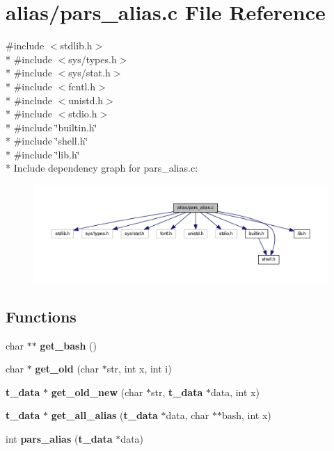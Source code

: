 \section{alias/pars\-\_\-alias.c File Reference}
\label{pars__alias_8c}
{\ttfamily \#include $<$stdlib.\-h$>$}\\*
{\ttfamily \#include $<$sys/types.\-h$>$}\\*
{\ttfamily \#include $<$sys/stat.\-h$>$}\\*
{\ttfamily \#include $<$fcntl.\-h$>$}\\*
{\ttfamily \#include $<$unistd.\-h$>$}\\*
{\ttfamily \#include $<$stdio.\-h$>$}\\*
{\ttfamily \#include \char`\"{}builtin.\-h\char`\"{}}\\*
{\ttfamily \#include \char`\"{}shell.\-h\char`\"{}}\\*
{\ttfamily \#include \char`\"{}lib.\-h\char`\"{}}\\*
Include dependency graph for pars\-\_\-alias.\-c\-:
\nopagebreak
\begin{figure}[H]
\begin{center}
\leavevmode
\includegraphics[width=350pt]{pars__alias_8c__incl}
\end{center}
\end{figure}
\subsection*{Functions}
\begin{DoxyCompactItemize}
\item 
char $\ast$$\ast$ {\bf get\-\_\-bash} ()
\item 
char $\ast$ {\bf get\-\_\-old} (char $\ast$str, int x, int i)
\item 
{\bf t\-\_\-data} $\ast$ {\bf get\-\_\-old\-\_\-new} (char $\ast$str, {\bf t\-\_\-data} $\ast$data, int x)
\item 
{\bf t\-\_\-data} $\ast$ {\bf get\-\_\-all\-\_\-alias} ({\bf t\-\_\-data} $\ast$data, char $\ast$$\ast$bash, int x)
\item 
int {\bf pars\-\_\-alias} ({\bf t\-\_\-data} $\ast$data)
\end{DoxyCompactItemize}


